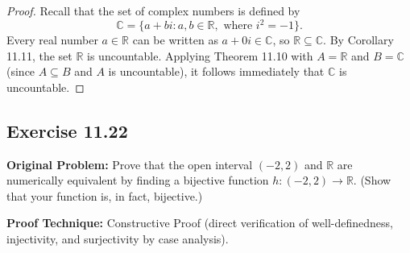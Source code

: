 \documentclass[11pt, letterpaper]{article}
\theoremstyle{definition}
\theoremstyle{remark}
\begin{document}
\begin{proof}
Recall that the set of complex numbers is defined by
\[
\mathbb{C} = \{a + bi : a, b \in \mathbb{R}, \text{ where } i^2 = -1\}.
\]
Every real number $a \in \mathbb{R}$ can be written as $a + 0i \in \mathbb{C}$, so $\mathbb{R} \subseteq \mathbb{C}$. By Corollary 11.11, the set $\mathbb{R}$ is uncountable. Applying Theorem 11.10 with $A = \mathbb{R}$ and $B = \mathbb{C}$ (since $A \subseteq B$ and $A$ is uncountable), it follows immediately that $\mathbb{C}$ is uncountable.
\end{proof}

\subsection{Exercise 11.22}

\textbf{Original Problem:} Prove that the open interval $(-2, 2)$ and $\mathbb{R}$ are numerically equivalent by finding a bijective function $h : (-2, 2) \to \mathbb{R}$. (Show that your function is, in fact, bijective.)

\textbf{Proof Technique:} Constructive Proof (direct verification of well-definedness, injectivity, and surjectivity by case analysis).
\end{document}

